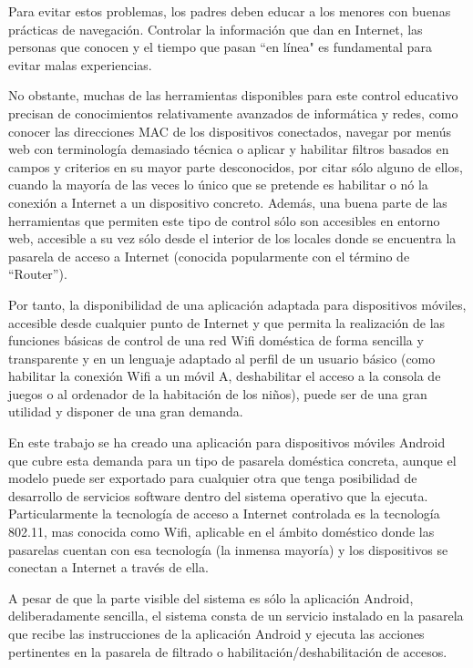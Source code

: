 \documentclass[12pt]{article}
\begin{document}
Para evitar estos problemas, los padres deben educar a los menores con buenas prácticas de navegación. Controlar la información que dan en Internet, las personas que conocen y el tiempo que pasan ``en línea" es fundamental para evitar malas experiencias. 

No obstante, muchas de las herramientas disponibles para este control educativo precisan de conocimientos relativamente avanzados de informática y redes, como conocer las direcciones MAC de los dispositivos conectados, navegar por menús web con terminología demasiado técnica o aplicar y habilitar filtros basados en campos y criterios en su mayor parte desconocidos, por citar sólo alguno de ellos, cuando la mayoría de las veces lo único que se pretende es habilitar o nó la conexión a Internet a un dispositivo concreto. Además, una buena parte de las herramientas que permiten este tipo de control sólo son accesibles en entorno web, accesible a su vez sólo desde el interior de los locales donde se encuentra la pasarela de acceso a Internet (conocida popularmente con el término de ``Router'').

Por tanto, la disponibilidad de una aplicación adaptada para dispositivos móviles, accesible desde cualquier punto de Internet y que permita la realización de las funciones básicas de control de una red Wifi doméstica de forma sencilla y transparente y en un lenguaje adaptado al perfil de un usuario básico (como habilitar la conexión Wifi a un móvil A, deshabilitar el acceso a la consola de juegos o al ordenador de la habitación de los niños), puede ser de una gran utilidad y disponer de una gran demanda.

En este trabajo se ha creado una aplicación para dispositivos móviles Android que cubre esta demanda para un tipo de pasarela doméstica concreta, aunque el modelo puede ser exportado para cualquier otra que tenga posibilidad de desarrollo de servicios software dentro del sistema operativo que la ejecuta. Particularmente la tecnología de acceso a Internet controlada es la tecnología 802.11, mas conocida como Wifi, aplicable en el ámbito doméstico donde las pasarelas cuentan con esa tecnología (la inmensa mayoría) y los dispositivos se conectan a Internet a través de ella.

A pesar de que la parte visible del sistema es sólo la aplicación Android, deliberadamente sencilla, el sistema consta de un servicio instalado en la pasarela que recibe las instrucciones de la aplicación Android y ejecuta las acciones pertinentes en la pasarela de filtrado o habilitación/deshabilitación de accesos. 
\end{document}
